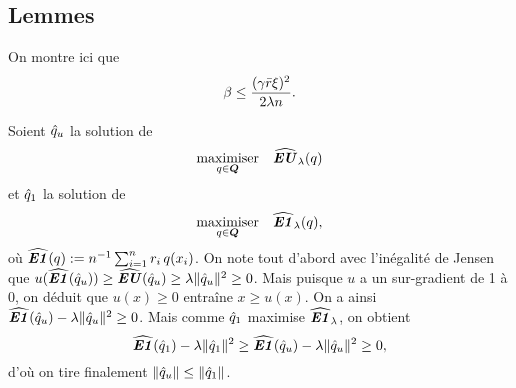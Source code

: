 \subsection{Lemmes}

\begin{lemme}[Stabilité]
\label{lem:stab}
On montre ici que
\begin{equation}
  \beta \leq \frac{(\gamma\rmax\xi)^2}{2\lambda n}.
\end{equation}
\end{lemme}


\begin{lemme}
  \label{lem:rn}
  Soient $\qu$ la solution de
  \begin{equation}
    \maximizeEquation[q \in \Q]{\hEU_\lambda(q)}
  \end{equation}
  et $\qn$ la solution de
  \begin{equation}
    \maximizeEquation[q \in \Q]{\hEN_\lambda(q),}
  \end{equation}
  où $\hEN(q):=n^{-1}\sumi r_i\,q(x_i)$. On note tout d'abord avec l'inégalité de Jensen
  que $u(\hEN(\qu)) \geq \hEU(\qu) \geq \lambda\nq{\qu}^2 \geq 0$. Mais puisque $u$ a un sur-gradient de
  1 à $0$, on déduit que $u(x) \geq 0$ entraîne $x \geq u(x)$. On a ainsi
  $\hEN(\qu) - \lambda\nq{\qu}^2 \geq 0$. Mais comme $\qn$ maximise $\hEN_\lambda$, on obtient
  \begin{equation}
    \hEN(\qn) - \lambda\nq{\qn}^2 \geq \hEN(\qu) - \lambda\nq{\qu}^2 \geq 0,
  \end{equation}
  d'où on tire finalement $\nq{\qu} \leq \nq{\qn}$.
\end{lemme}


